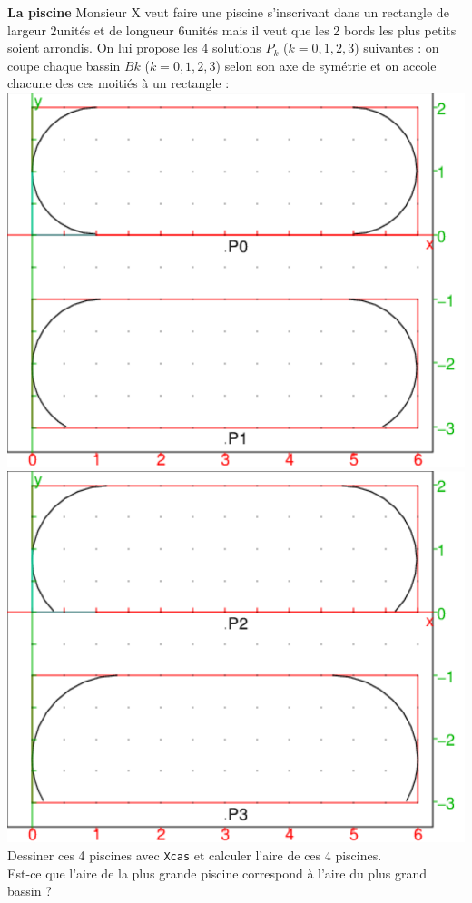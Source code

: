 \documentclass[a4paper,11pt]{book}
\begin{document}
{\bf La piscine}
Monsieur X veut faire une piscine s'inscrivant dans un rectangle de largeur
$2$unit\'es et de longueur $6$unit\'es mais il veut que les 2 bords les plus 
petits soient arrondis.
On lui propose les 4 solutions $P_k$ ($k=0,1,2,3$) suivantes : 
on coupe chaque bassin $Bk$ ($k=0,1,2,3$) selon son axe de sym\'etrie et on 
accole chacune des ces moiti\'es \`a un rectangle :\\
\includegraphics[width=\textwidth]{bassin01}\\
\includegraphics[width=\textwidth]{bassin23}\\
Dessiner ces 4 piscines avec {\tt Xcas} et calculer l'aire de ces 4 piscines.\\
Est-ce que l'aire de la plus grande piscine correspond \`a l'aire du plus 
grand bassin ? 
\end{document}
